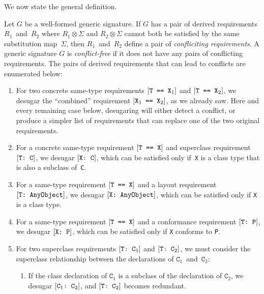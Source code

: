 \documentclass[../generics]{subfiles}
\begin{document}
We now state the general definition.

\begin{definition}\label{conflicting req def}
Let $G$ be a well-formed generic signature. If $G$ has a pair of derived requirements $R_1$~and~$R_2$ where $R_1\otimes\Sigma$ and $R_2\otimes\Sigma$ cannot both be satisfied by the same substitution map~$\Sigma$, then $R_1$~and~$R_2$ define a pair of \emph{confliciting requirements}. A generic signature $G$ is \emph{conflict-free} if it does not have any pairs of conflicting requirements. The pairs of derived requirements that can lead to conflicts are enumerated below:
\begin{enumerate}
\item For two concrete same-type requirements $[\texttt{T == $\texttt{X}_1$}]$ and $[\texttt{T == $\texttt{X}_2$}]$, we desugar the ``combined'' requirement $[\texttt{$\texttt{X}_1$ == $\texttt{X}_2$}]$, as we already saw. Here and every remaining case below, desugaring will either detect a conflict, or produce a simpler list of requirements that can replace one of the two original requirements.
\item For a concrete same-type requirement $[\texttt{T == X}]$ and superclass requirement $[\texttt{T:~C}]$, we desugar $[\texttt{X:~C}]$, which can be satisfied only if~\texttt{X} is a class type that is also a subclass of~\texttt{C}.
\item For a same-type requirement $[\texttt{T == X}]$ and a layout requirement $[\texttt{T:~AnyObject}]$, we desugar $[\texttt{X:~AnyObject}]$, which can be satisfied only if \texttt{X} is a class type.
\item For a same-type requirement $[\texttt{T == X}]$ and a conformance requirement $[\texttt{T:~P}]$, we desugar $[\texttt{X:~P}]$, which can be satisfied only if \texttt{X} conforms to \texttt{P}.
\item For two superclass requirements $[\texttt{T:~$\texttt{C}_1$}]$ and $[\texttt{T:~$\texttt{C}_2$}]$, we must consider the superclass relationship between the declarations of $\texttt{C}_1$~and~$\texttt{C}_2$:
\begin{enumerate}
\item If the class declaration of $\texttt{C}_1$ is a subclass of the declaration of $\texttt{C}_2$, we desugar $[\texttt{$\texttt{C}_1$:~$\texttt{C}_2$}]$, and $[\texttt{T:~$\texttt{C}_2$}]$ becomes redundant.

\end{enumerate}
\end{enumerate}
\end{definition}
\end{document}

